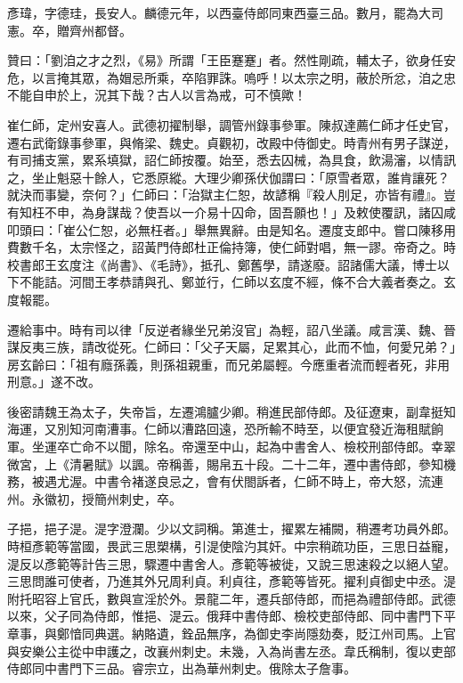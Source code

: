 \begin{pinyinscope}
 彥瑋，字德珪，長安人。麟德元年，以西臺侍郎同東西臺三品。數月，罷為大司憲。卒，贈齊州都督。



 贊曰：「劉洎之才之烈，《易》所謂「王臣蹇蹇」者。然性剛疏，輔太子，欲身任安危，以言掩其眾，為媢忌所乘，卒陷罪誅。嗚呼！以太宗之明，蔽於所忿，洎之忠不能自申於上，況其下哉？古人以言為戒，可不慎歟！



 崔仁師，定州安喜人。武德初擢制舉，調管州錄事參軍。陳叔達薦仁師才任史官，遷右武衛錄事參軍，與脩梁、魏史。貞觀初，改殿中侍御史。時青州有男子謀逆，有司捕支黨，累系填獄，詔仁師按覆。始至，悉去囚械，為具食，飲湯瀋，以情訊之，坐止魁惡十餘人，它悉原縱。大理少卿孫伏伽謂曰：「原雪者眾，誰肯讓死？就決而事變，奈何？」仁師曰：「治獄主仁恕，故諺稱『殺人刖足，亦皆有禮』。豈有知枉不申，為身謀哉？使吾以一介易十囚命，固吾願也！」及敕使覆訊，諸囚咸叩頭曰：「崔公仁恕，必無枉者。」舉無異辭。由是知名。遷度支郎中。嘗口陳移用費數千名，太宗怪之，詔黃門侍郎杜正倫持簿，使仁師對唱，無一謬。帝奇之。時校書郎王玄度注《尚書》、《毛詩》，抵孔、鄭舊學，請遂廢。詔諸儒大議，博士以下不能詰。河間王孝恭請與孔、鄭並行，仁師以玄度不經，條不合大義者奏之。玄度報罷。



 遷給事中。時有司以律「反逆者緣坐兄弟沒官」為輕，詔八坐議。咸言漢、魏、晉謀反夷三族，請改從死。仁師曰：「父子天屬，足累其心，此而不恤，何愛兄弟？」房玄齡曰：「祖有廕孫義，則孫祖親重，而兄弟屬輕。今應重者流而輕者死，非用刑意。」遂不改。



 後密請魏王為太子，失帝旨，左遷鴻臚少卿。稍進民部侍郎。及征遼東，副韋挺知海運，又別知河南漕事。仁師以漕路回遠，恐所輸不時至，以便宜發近海租賦餉軍。坐運卒亡命不以聞，除名。帝還至中山，起為中書舍人、檢校刑部侍郎。幸翠微宮，上《清暑賦》以諷。帝稱善，賜帛五十段。二十二年，遷中書侍郎，參知機務，被遇尤渥。中書令褚遂良忌之，會有伏閤訴者，仁師不時上，帝大怒，流連州。永徽初，授簡州刺史，卒。



 子挹，挹子湜。湜字澄瀾。少以文詞稱。第進士，擢累左補闕，稍遷考功員外郎。時桓彥範等當國，畏武三思槊構，引湜使陰汋其奸。中宗稍疏功臣，三思日益寵，湜反以彥範等計告三思，驟遷中書舍人。彥範等被徙，又說三思速殺之以絕人望。三思問誰可使者，乃進其外兄周利貞。利貞往，彥範等皆死。擢利貞御史中丞。湜附托昭容上官氏，數與宣淫於外。景龍二年，遷兵部侍郎，而挹為禮部侍郎。武德以來，父子同為侍郎，惟挹、湜云。俄拜中書侍郎、檢校吏部侍郎、同中書門下平章事，與鄭愔同典選。納賂遺，銓品無序，為御史李尚隱劾奏，貶江州司馬。上官與安樂公主從中申護之，改襄州刺史。未幾，入為尚書左丞。韋氏稱制，復以吏部侍郎同中書門下三品。睿宗立，出為華州刺史。俄除太子詹事。




\end{pinyinscope}
